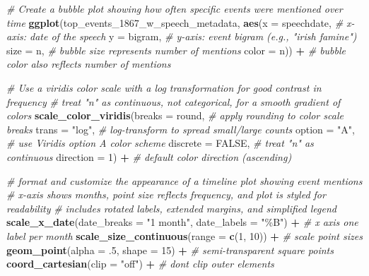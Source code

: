 \documentclass[
]{article}
\newenvironment{Shaded}{\begin{snugshade}}{\end{snugshade}}
\newcommand{\AttributeTok}[1]{\textcolor[rgb]{0.13,0.29,0.53}{#1}}
\newcommand{\CommentTok}[1]{\textcolor[rgb]{0.56,0.35,0.01}{\textit{#1}}}
\newcommand{\ConstantTok}[1]{\textcolor[rgb]{0.56,0.35,0.01}{#1}}
\newcommand{\DecValTok}[1]{\textcolor[rgb]{0.00,0.00,0.81}{#1}}
\newcommand{\FunctionTok}[1]{\textcolor[rgb]{0.13,0.29,0.53}{\textbf{#1}}}
\newcommand{\NormalTok}[1]{#1}
\newcommand{\SpecialCharTok}[1]{\textcolor[rgb]{0.81,0.36,0.00}{\textbf{#1}}}
\newcommand{\StringTok}[1]{\textcolor[rgb]{0.31,0.60,0.02}{#1}}
\begin{document}
\begin{Shaded}
\begin{Highlighting}[]
\CommentTok{\# Create a bubble plot showing how often specific events were mentioned over time}
\FunctionTok{ggplot}\NormalTok{(top\_events\_1867\_w\_speech\_metadata, }
       \FunctionTok{aes}\NormalTok{(}\AttributeTok{x =}\NormalTok{ speechdate, }\CommentTok{\# x{-}axis: date of the speech}
           \AttributeTok{y =}\NormalTok{ bigram, }\CommentTok{\# y{-}axis: event bigram (e.g., "irish famine")}
           \AttributeTok{size =}\NormalTok{ n, }\CommentTok{\# bubble size represents number of mentions}
           \AttributeTok{color =}\NormalTok{ n)) }\SpecialCharTok{+} \CommentTok{\# bubble color also reflects number of mentions}

  \CommentTok{\# Use a viridis color scale with a log transformation for good contrast in frequency}
  \CommentTok{\# treat "n" as continuous, not categorical, for a smooth gradient of colors}
  \FunctionTok{scale\_color\_viridis}\NormalTok{(}\AttributeTok{breaks =}\NormalTok{ round, }\CommentTok{\# apply rounding to color scale breaks}
                      \AttributeTok{trans =} \StringTok{"log"}\NormalTok{, }\CommentTok{\# log{-}transform to spread small/large counts}
                      \AttributeTok{option =} \StringTok{"A"}\NormalTok{, }\CommentTok{\# use Viridis option A color scheme}
                      \AttributeTok{discrete =} \ConstantTok{FALSE}\NormalTok{, }\CommentTok{\# treat "n" as continuous}
                      \AttributeTok{direction =} \DecValTok{1}\NormalTok{) }\SpecialCharTok{+} \CommentTok{\# default color direction (ascending)}

  \CommentTok{\# format and customize the appearance of a timeline plot showing event mentions}
  \CommentTok{\# x{-}axis shows months, point size reflects frequency, and plot is styled for readability}
  \CommentTok{\# includes rotated labels, extended margins, and simplified legend}
  \FunctionTok{scale\_x\_date}\NormalTok{(}\AttributeTok{date\_breaks =} \StringTok{"1 month"}\NormalTok{, }\AttributeTok{date\_labels =} \StringTok{"\%B"}\NormalTok{) }\SpecialCharTok{+} \CommentTok{\# x axis one label per month}
  \FunctionTok{scale\_size\_continuous}\NormalTok{(}\AttributeTok{range =} \FunctionTok{c}\NormalTok{(}\DecValTok{1}\NormalTok{, }\DecValTok{10}\NormalTok{)) }\SpecialCharTok{+} \CommentTok{\# scale point sizes}
  \FunctionTok{geom\_point}\NormalTok{(}\AttributeTok{alpha =}\NormalTok{ .}\DecValTok{5}\NormalTok{, }\AttributeTok{shape =} \DecValTok{15}\NormalTok{) }\SpecialCharTok{+} \CommentTok{\# semi{-}transparent square points}
  \FunctionTok{coord\_cartesian}\NormalTok{(}\AttributeTok{clip =} \StringTok{"off"}\NormalTok{) }\SpecialCharTok{+} \CommentTok{\# don\textquotesingle{}t clip outer elements}


\end{Highlighting}
\end{Shaded}
\end{document}
